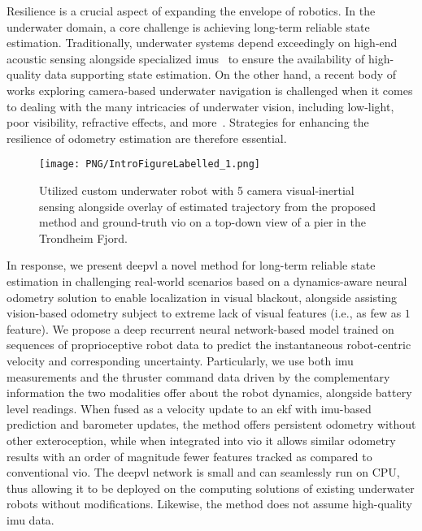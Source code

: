 Resilience is a crucial aspect of expanding the envelope of robotics. In the underwater domain, a core challenge is achieving long-term reliable state estimation. Traditionally, underwater systems depend exceedingly on high-end acoustic sensing alongside specialized \acp{imu}~\cite{wu2019survey} to ensure the availability of high-quality data supporting state estimation. On the other hand, a recent body of works exploring camera-based underwater navigation is challenged when it comes to dealing with the many intricacies of underwater vision, including low-light, poor visibility, refractive effects, and more~\cite{singh2024online,miao2021univio,ferrera2019aqualoc,gu2019environment}. Strategies for enhancing the resilience of odometry estimation are therefore essential.

\begin{figure}
    \centering
    \texttt{[image: PNG/IntroFigureLabelled\_1.png]}
    \vspace{-4ex}
    \caption{Utilized custom underwater robot with 5 camera visual-inertial sensing alongside overlay of estimated trajectory from the proposed method and ground-truth \ac{vio} on a top-down view of a pier in the Trondheim Fjord.}
    \vspace{-4ex}
    \label{fig:introfigure}
\end{figure}\par
In response, we present \ac{deepvl} a novel method for long-term reliable state estimation in challenging real-world scenarios based on a dynamics-aware neural odometry solution to enable localization in visual blackout, alongside assisting vision-based odometry subject to extreme lack of visual features (i.e., as few as $1$ feature). We propose a deep recurrent neural network-based model trained on sequences of proprioceptive robot data to predict the instantaneous robot-centric velocity and corresponding uncertainty. Particularly, we use both \ac{imu} measurements and the thruster command data driven by the complementary information the two modalities offer about the robot dynamics, alongside battery level readings. When fused as a velocity update to an \ac{ekf} with \ac{imu}-based prediction and barometer updates, the method offers persistent odometry without other exteroception, while when integrated into \ac{vio} it allows similar odometry results with an order of magnitude fewer features tracked as compared to conventional \ac{vio}. The \ac{deepvl} network is small and can seamlessly run on CPU, thus allowing it to be deployed on the computing solutions of existing underwater robots without modifications. Likewise, the method does not assume high-quality \ac{imu} data.

